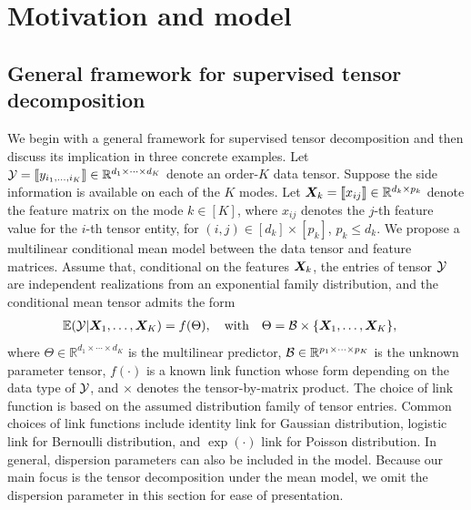 \documentclass[12pt]{article}
\theoremstyle{definition}
\theoremstyle{definition}
\begin{document}
\section{Motivation and model}\label{sec:model}
\subsection{General framework for supervised tensor decomposition}
We begin with a general framework for supervised tensor decomposition and then discuss its implication in three concrete examples. Let $\mathcal{Y}=\llbracket y_{i_1,\ldots,i_K} \rrbracket\in\mathbb{R}^{d_1\times \cdots\times d_K}$ denote an order-$K$ data tensor. Suppose the side information is available on each of the $K$ modes. Let $\bm X_k=\llbracket x_{ij} \rrbracket\in\mathbb{R}^{d_k\times p_k}$ denote the feature matrix on the mode $k\in[K]$, where $x_{ij}$ denotes the $j$-th feature value for the $i$-th tensor entity, for $(i,j)\in[d_k]\times[p_k]$, $p_k\leq d_k$. We propose a multilinear conditional mean model between the data tensor and feature matrices. Assume that, conditional on the features $\bm X_k$, the entries of tensor $\mathcal{Y}$ are independent realizations from an exponential family distribution, and the conditional mean tensor admits the form
\begin{align}\label{eq:tensormodel}
&\mathbb{E}(\mathcal{Y}|\bm X_1,\ldots,\bm X_K)=f(\Theta),\quad \text{with}\quad \Theta =\mathcal{B}\times\{\bm X_1,\ldots, \bm X_K\} ,
\end{align}
where $\Theta\in\mathbb{R}^{d_1\times \cdots\times d_K}$ is the multilinear predictor, $\mathcal{B}\in\mathbb{R}^{p_1\times \cdots \times p_K}$ is the unknown parameter tensor, $f(\cdot)$ is a known link function whose form depending on the data type of $\mathcal{Y}$, and $\times$ denotes the tensor-by-matrix product. The choice of link function is based on the assumed distribution family of tensor entries. Common choices of link functions include identity link for Gaussian distribution, logistic link for Bernoulli distribution, and $\exp(\cdot)$ link for Poisson distribution. In general, dispersion parameters can also be included in the model. Because our main focus is the tensor decomposition under the mean model, we omit the dispersion parameter in this section for ease of presentation. 
\end{document}
